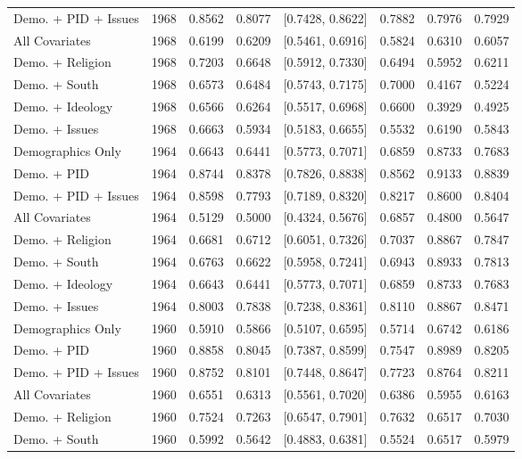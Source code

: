 \begin{longtable}{lrrrlrrr}
  Demo. + PID + Issues & 1968 & 0.8562 & 0.8077 & [0.7428, 0.8622] & 0.7882 & 0.7976 & 0.7929 \\ 
  All Covariates & 1968 & 0.6199 & 0.6209 & [0.5461, 0.6916] & 0.5824 & 0.6310 & 0.6057 \\ 
  Demo. + Religion & 1968 & 0.7203 & 0.6648 & [0.5912, 0.7330] & 0.6494 & 0.5952 & 0.6211 \\ 
  Demo. + South & 1968 & 0.6573 & 0.6484 & [0.5743, 0.7175] & 0.7000 & 0.4167 & 0.5224 \\ 
  Demo. + Ideology & 1968 & 0.6566 & 0.6264 & [0.5517, 0.6968] & 0.6600 & 0.3929 & 0.4925 \\ 
  Demo. + Issues & 1968 & 0.6663 & 0.5934 & [0.5183, 0.6655] & 0.5532 & 0.6190 & 0.5843 \\ 
  Demographics Only & 1964 & 0.6643 & 0.6441 & [0.5773, 0.7071] & 0.6859 & 0.8733 & 0.7683 \\ 
  Demo. + PID & 1964 & 0.8744 & 0.8378 & [0.7826, 0.8838] & 0.8562 & 0.9133 & 0.8839 \\ 
  Demo. + PID + Issues & 1964 & 0.8598 & 0.7793 & [0.7189, 0.8320] & 0.8217 & 0.8600 & 0.8404 \\ 
  All Covariates & 1964 & 0.5129 & 0.5000 & [0.4324, 0.5676] & 0.6857 & 0.4800 & 0.5647 \\ 
  Demo. + Religion & 1964 & 0.6681 & 0.6712 & [0.6051, 0.7326] & 0.7037 & 0.8867 & 0.7847 \\ 
  Demo. + South & 1964 & 0.6763 & 0.6622 & [0.5958, 0.7241] & 0.6943 & 0.8933 & 0.7813 \\ 
  Demo. + Ideology & 1964 & 0.6643 & 0.6441 & [0.5773, 0.7071] & 0.6859 & 0.8733 & 0.7683 \\ 
  Demo. + Issues & 1964 & 0.8003 & 0.7838 & [0.7238, 0.8361] & 0.8110 & 0.8867 & 0.8471 \\ 
  Demographics Only & 1960 & 0.5910 & 0.5866 & [0.5107, 0.6595] & 0.5714 & 0.6742 & 0.6186 \\ 
  Demo. + PID & 1960 & 0.8858 & 0.8045 & [0.7387, 0.8599] & 0.7547 & 0.8989 & 0.8205 \\ 
  Demo. + PID + Issues & 1960 & 0.8752 & 0.8101 & [0.7448, 0.8647] & 0.7723 & 0.8764 & 0.8211 \\ 
  All Covariates & 1960 & 0.6551 & 0.6313 & [0.5561, 0.7020] & 0.6386 & 0.5955 & 0.6163 \\ 
  Demo. + Religion & 1960 & 0.7524 & 0.7263 & [0.6547, 0.7901] & 0.7632 & 0.6517 & 0.7030 \\ 
  Demo. + South & 1960 & 0.5992 & 0.5642 & [0.4883, 0.6381] & 0.5524 & 0.6517 & 0.5979 \\ 

\end{longtable}
